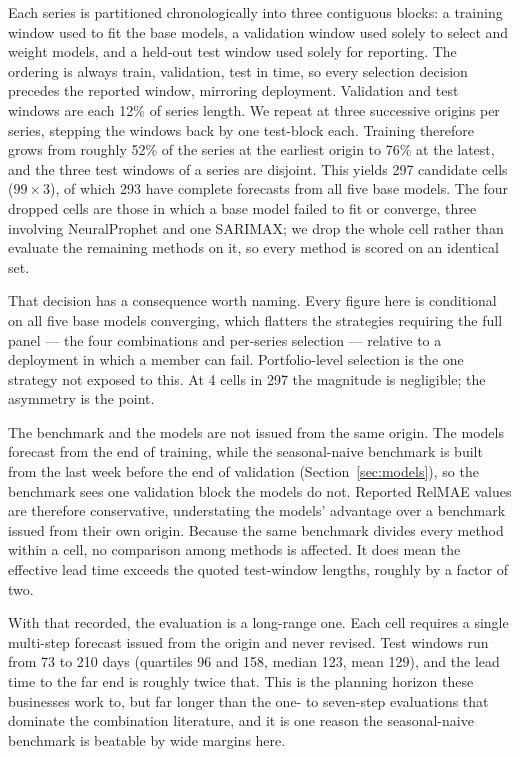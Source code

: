 \documentclass[11pt]{article}
\begin{document}
Each series is partitioned chronologically into three contiguous blocks: a training window used to fit the base models, a validation window used solely to select and weight models, and a held-out test window used solely for reporting. The ordering is always train, validation, test in time, so every selection decision precedes the reported window, mirroring deployment. Validation and test windows are each 12\% of series length. We repeat at three successive origins per series, stepping the windows back by one test-block each. Training therefore grows from roughly 52\% of the series at the earliest origin to 76\% at the latest, and the three test windows of a series are disjoint. This yields 297 candidate cells ($99 \times 3$), of which 293 have complete forecasts from all five base models. The four dropped cells are those in which a base model failed to fit or converge, three involving NeuralProphet and one SARIMAX; we drop the whole cell rather than evaluate the remaining methods on it, so every method is scored on an identical set.

That decision has a consequence worth naming. Every figure here is conditional on all five base models converging, which flatters the strategies requiring the full panel --- the four combinations and per-series selection --- relative to a deployment in which a member can fail. Portfolio-level selection is the one strategy not exposed to this. At 4 cells in 297 the magnitude is negligible; the asymmetry is the point.

The benchmark and the models are not issued from the same origin. The models forecast from the end of training, while the seasonal-naive benchmark is built from the last week before the end of validation (Section~\ref{sec:models}), so the benchmark sees one validation block the models do not. Reported RelMAE values are therefore conservative, understating the models' advantage over a benchmark issued from their own origin. Because the same benchmark divides every method within a cell, no comparison among methods is affected. It does mean the effective lead time exceeds the quoted test-window lengths, roughly by a factor of two.

With that recorded, the evaluation is a long-range one. Each cell requires a single multi-step forecast issued from the origin and never revised. Test windows run from 73 to 210 days (quartiles 96 and 158, median 123, mean 129), and the lead time to the far end is roughly twice that. This is the planning horizon these businesses work to, but far longer than the one- to seven-step evaluations that dominate the combination literature, and it is one reason the seasonal-naive benchmark is beatable by wide margins here.
\end{document}
